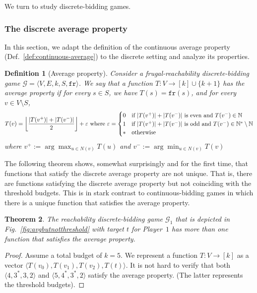 \documentclass{article}\providecommand{\nequiv}{\not\equiv}\usepackage[a4paper,margin=20mm]{geometry}
\newtheorem{theorem}{Theorem}\newtheorem{lemma}[theorem]{Lemma}\newtheorem{proposition}[theorem]{Proposition}\newtheorem{corollary}[theorem]{Corollary}\newtheorem{definition}[theorem]{Definition}\newtheorem{claim}[theorem]{Claim}\newtheorem{remark}[theorem]{Remark}\newtheorem{observation}[theorem]{Observation}\newtheorem{conjecture}[theorem]{Conjecture}\newtheorem{example}[theorem]{Example}
\newcommand{\PO}{Player~$1$\xspace}
\newcommand{\G}{{\mathcal G}}
\newcommand{\fr}{\texttt{fr}}
\newcommand{\Nat}{\mathbb{N}}
\newcommand{\zug}[1]{\langle #1  \rangle}
\renewcommand{\set}[1]{\{ #1  \}}
\newcommand{\eps}{\varepsilon}
\DeclarePairedDelimiter{\adjustfloor}{\lfloor}{\rfloor}
\newcommand{\floor}[1]{\adjustfloor*{#1}}
\begin{document}
We turn to study discrete-bidding games. 

\subsubsection{The discrete average property}
\label{sec:average-based-strat}

In this section, we adapt the definition of the continuous average property (Def.~\ref{def:continuous-average}) to the discrete setting and analyze its properties. 

\begin{definition}[Average property]
\label{def:average}
Consider a frugal-reachability discrete-bidding game $\G = \zug{V, E, k, S, \fr}$. 
We say that a function $T: V  \rightarrow [k] \cup \set{k+1}$ has the {\em average property} if for every $s \in S$, we have $T(s) = \fr(s)$, and for every $v \in V \setminus S$, 
\[
T(v) = \floor{\frac{|T(v^+)| + |T(v^-)|}{2}} +\eps
\text{ where }
\eps = 
\begin{cases}
0 &\text{if~} |T(v^+)| + |T(v^-)| \text{ is even and~} T(v^-) \in \Nat \\
1 &\text{if~} |T(v^+)| + |T(v^-)| \text{ is odd and~} T(v^-) \in \Nat^* \setminus \Nat \\
* &\text{otherwise}
\end{cases}
\]
where $v^+ := \arg\max_{u \in N(v)} T(u)$ and $v^- := \arg\min_{u \in N(v)} T(v)$
\end{definition}



The following theorem shows, somewhat surprisingly and for the first time, that functions that satisfy the discrete average property are not unique. That is, there are functions satisfying the discrete average property but not coinciding with the threshold budgets. 
This is in stark contrast to continuous-bidding games in which there is a unique function that satisfies the average property.

\begin{theorem}
\label{thm:non-unique}
The reachability discrete-bidding game $\G_1$ that is depicted in Fig.~\ref{fig:avgbutnotthreshold} with target $t$ for \PO has more than one function that satisfies the average property. 
\end{theorem}
\begin{proof}
Assume a total budget of $k = 5$. We represent a function $T: V \rightarrow [k]$ as a vector $\zug{T(v_0), T(v_1), T(v_2), T(t)}$. It is not hard to verify that both $\zug{4,3^*,3,2}$ and $\zug{5,4^*,3^*,2}$ satisfy the average property. (The latter represents the threshold budgets). 
\end{proof}
\end{document}
